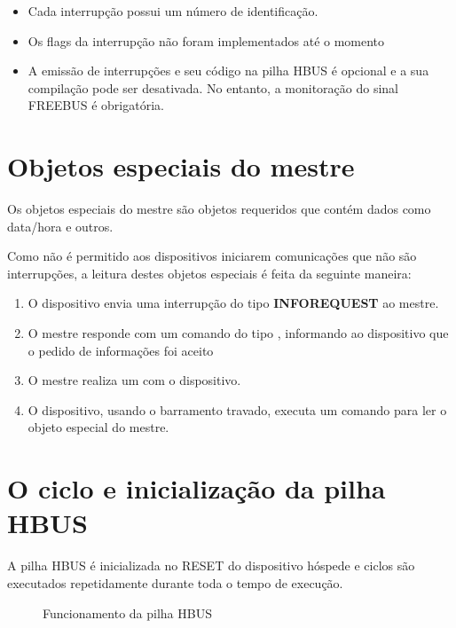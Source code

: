 \begin{itemize}

\item Cada interrupção possui um número de identificação.
\item Os flags da interrupção não foram implementados até o momento
\item A emissão de interrupções e seu código na pilha HBUS é opcional e a sua compilação pode ser desativada. No entanto, a monitoração do sinal FREEBUS é obrigatória.

\end{itemize}

\section{Objetos especiais do mestre}

Os objetos especiais do mestre são objetos requeridos que contém dados como data/hora e outros.

Como não é permitido aos dispositivos iniciarem comunicações que não são interrupções, a leitura destes objetos especiais é feita da seguinte maneira:

\begin{enumerate}
\item O dispositivo envia uma interrupção do tipo \textbf{INFOREQUEST} ao mestre.
\item O mestre responde com um comando do tipo , informando ao dispositivo que o pedido de informações foi aceito
\item O mestre realiza um  com o dispositivo.
\item O dispositivo, usando o barramento travado, executa um comando  para ler o objeto especial do mestre.
\end{enumerate}



\section{O ciclo e inicialização da pilha HBUS}

A pilha HBUS é inicializada no RESET do dispositivo hóspede e ciclos são executados repetidamente durante toda o tempo de execução.

\begin{figure}[H]
\centering

\caption{Funcionamento da pilha HBUS}
\end{figure}
